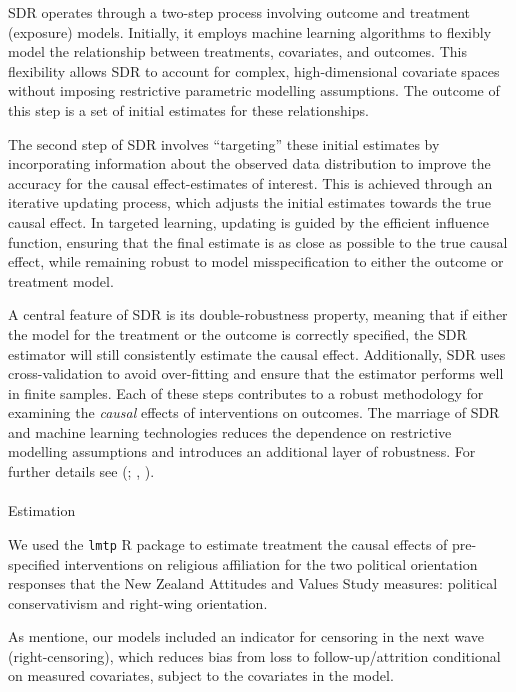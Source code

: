 \documentclass[
  singlecolumn]{article}
\makeatletter
\let\oldparagraph\paragraph
\renewcommand{\paragraph}{
    \@ifstar
      \xxxParagraphStar
      \xxxParagraphNoStar
  }
\newcommand{\xxxParagraphStar}[1]{\oldparagraph*{#1}\mbox{}}
\newcommand{\xxxParagraphNoStar}[1]{\oldparagraph{#1}\mbox{}}
\makeatother
\begin{document}
SDR operates through a two-step process involving outcome and treatment
(exposure) models. Initially, it employs machine learning algorithms to
flexibly model the relationship between treatments, covariates, and
outcomes. This flexibility allows SDR to account for complex,
high-dimensional covariate spaces without imposing restrictive
parametric modelling assumptions. The outcome of this step is a set of
initial estimates for these relationships.

The second step of SDR involves ``targeting'' these initial estimates by
incorporating information about the observed data distribution to
improve the accuracy for the causal effect-estimates of interest. This
is achieved through an iterative updating process, which adjusts the
initial estimates towards the true causal effect. In targeted learning,
updating is guided by the efficient influence function, ensuring that
the final estimate is as close as possible to the true causal effect,
while remaining robust to model misspecification to either the outcome
or treatment model.

A central feature of SDR is its double-robustness property, meaning that
if either the model for the treatment or the outcome is correctly
specified, the SDR estimator will still consistently estimate the causal
effect. Additionally, SDR uses cross-validation to avoid over-fitting
and ensure that the estimator performs well in finite samples. Each of
these steps contributes to a robust methodology for examining the
\emph{causal} effects of interventions on outcomes. The marriage of SDR
and machine learning technologies reduces the dependence on restrictive
modelling assumptions and introduces an additional layer of robustness.
For further details see (; ,
).

\paragraph{Estimation}\label{estimation}

We used the \texttt{lmtp} R package to estimate treatment the causal
effects of pre-specified interventions on religious affiliation for the
two political orientation responses that the New Zealand Attitudes and
Values Study measures: political conservativism and right-wing
orientation.

As mentione, our models included an indicator for censoring in the next
wave (right-censoring), which reduces bias from loss to
follow-up/attrition conditional on measured covariates, subject to the
covariates in the model.
\end{document}
